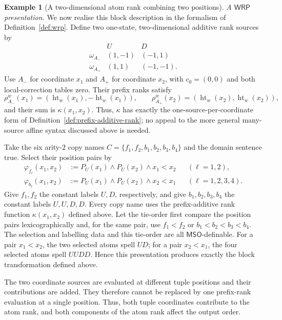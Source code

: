 \documentclass[11pt]{article}
\theoremstyle{definition}
\newtheorem{example}[theorem]{Example}
\newcommand{\WRP}{\mathsf{WRP}}
\newcommand{\MSO}{\mathsf{MSO}}
\begin{document}
\begin{example}[A two-dimensional atom rank combining two positions]
\vspace{0.5em}
\noindent\emph{A $\WRP$ presentation.}
We now realise this block description in the formalism of
Definition~\ref{def:wrp}.  Define two one-state, two-dimensional additive rank
sources by
\[
\begin{array}{c|cc}
 & U & D\\ \hline
\omega_{A_-} & (1,-1) & (-1,1)\\
\omega_{A_+} & (1,1)  & (-1,-1).
\end{array}
\]
Use $A_-$ for coordinate $x_1$ and $A_+$ for coordinate $x_2$, with
$c_0=(0,0)$ and both local-correction tables zero.  Their prefix ranks satisfy
\[
   \rho_{A_-}^w(x_1)=(\operatorname{ht}_w(x_1),-\operatorname{ht}_w(x_1)),\qquad
   \rho_{A_+}^w(x_2)=(\operatorname{ht}_w(x_2),\operatorname{ht}_w(x_2)),
\]
and their sum is $\kappa(x_1,x_2)$.  Thus, $\kappa$ has exactly the
one-source-per-coordinate form of
Definition~\ref{def:prefix-additive-rank}; no appeal to the more general
many-source affine syntax discussed above is needed.

Take the six arity-$2$ copy names
$C=\{f_1,f_2,b_1,b_2,b_3,b_4\}$ and the domain sentence $\mathrm{true}$.
Select
their position pairs by
\[
\begin{aligned}
   \varphi_{f_\ell}(x_1,x_2)
   &:=P_U(x_1)\land P_U(x_2)\land x_1<x_2
      &&(\ell=1,2),\\
   \varphi_{b_\ell}(x_1,x_2)
   &:=P_U(x_1)\land P_U(x_2)\land x_2<x_1
      &&(\ell=1,2,3,4).
\end{aligned}
\]
Give $f_1,f_2$ the constant labels $U,D$, respectively, and give
$b_1,b_2,b_3,b_4$ the constant labels $U,U,D,D$.  Every copy name uses the
prefix-additive rank function $\kappa(x_1,x_2)$ defined above.  Let the
tie-order first compare the position pairs lexicographically and, for the same pair, use $f_1<f_2$ or
$b_1<b_2<b_3<b_4$.  The selection and labelling data and this tie-order are
all $\MSO$-definable.  For a pair $x_1<x_2$, the two selected atoms spell
$UD$; for a pair $x_2<x_1$, the four selected atoms spell $UUDD$.  Hence this
presentation produces exactly the block transformation defined above.

The two coordinate sources are evaluated at different tuple positions and
their contributions are added.  They therefore cannot be replaced by one
prefix-rank evaluation at a single position.  Thus, both tuple coordinates
contribute to the atom rank, and both components of the atom rank affect the
output order.
\end{example}
\end{document}
